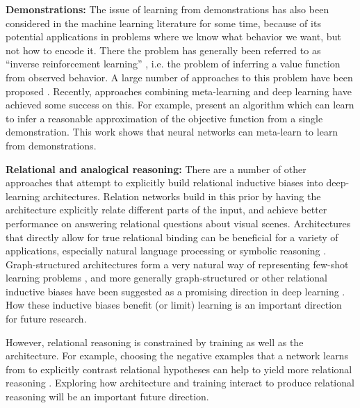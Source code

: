 \textbf{Demonstrations:} The issue of learning from demonstrations has also been considered in the machine learning literature for some time, because of its potential applications in problems where we know what behavior we want, but not how to encode it. There the problem has generally been referred to as ``inverse reinforcement learning'' \citep{Ng2000}, i.e. the problem of inferring a value function from observed behavior. A large number of approaches to this problem have been proposed \citep[e.g.][]{Ng2000, Abbeel2004}. Recently, approaches combining meta-learning and deep learning have achieved some success on this. For example, \citet{Finn2016} present an algorithm which can learn to infer a reasonable approximation of the objective function from a single demonstration. This work shows that neural networks can meta-learn to learn from demonstrations. \par

\textbf{Relational and analogical reasoning:} There are a number of other approaches that attempt to explicitly build relational inductive biases into deep-learning architectures. Relation networks \citep{Santoro2017} build in this prior by having the architecture explicitly relate different parts of the input, and achieve better performance on answering relational questions about visual scenes. Architectures that directly allow for true relational binding can be beneficial for a variety of applications, especially natural language processing or symbolic reasoning \citep[e.g.][]{Smolensky1990, Smolensky2014, Huang2017}. Graph-structured architectures form a very natural way of representing few-shot learning problems \citep{Garcia2018}, and more generally graph-structured or other relational inductive biases have been suggested as a promising direction in deep learning \citep{Battaglia2018}. How these inductive biases benefit (or limit) learning is an important direction for future research. \par 
However, relational reasoning is constrained by training as well as the architecture. For example, choosing the negative examples that a network learns from to explicitly contrast relational hypotheses can help to yield more relational reasoning \citep{Hill2019}. Exploring how architecture and training interact to produce relational reasoning will be an important future direction. \par


